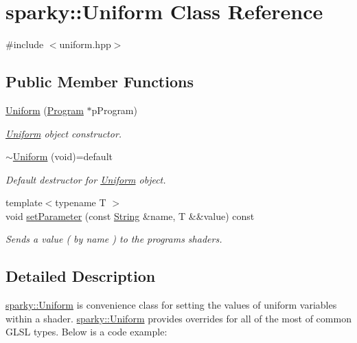 \hypertarget{classsparky_1_1_uniform}{}\section{sparky\+:\+:Uniform Class Reference}
\label{classsparky_1_1_uniform}


{\ttfamily \#include $<$uniform.\+hpp$>$}

\subsection*{Public Member Functions}
\begin{DoxyCompactItemize}
\item 
\hyperlink{classsparky_1_1_uniform_affc278498dc526c133c2133106cfbf83}{Uniform} (\hyperlink{classsparky_1_1_program}{Program} $\ast$p\+Program)
\begin{DoxyCompactList}\small\item\em \hyperlink{classsparky_1_1_uniform}{Uniform} object constructor. \end{DoxyCompactList}\item 
\hyperlink{classsparky_1_1_uniform_a612d7e16c60770dba6a93f4fa2f79983}{$\sim$\+Uniform} (void)=default\hypertarget{classsparky_1_1_uniform_a612d7e16c60770dba6a93f4fa2f79983}{}\label{classsparky_1_1_uniform_a612d7e16c60770dba6a93f4fa2f79983}

\begin{DoxyCompactList}\small\item\em Default destructor for \hyperlink{classsparky_1_1_uniform}{Uniform} object. \end{DoxyCompactList}\item 
{\footnotesize template$<$typename T $>$ }\\void \hyperlink{classsparky_1_1_uniform_a7a81c72ed894749245b0f2b52fccd203}{set\+Parameter} (const \hyperlink{classsparky_1_1_string}{String} \&name, T \&\&value) const 
\begin{DoxyCompactList}\small\item\em Sends a value ( by name ) to the programs shaders. \end{DoxyCompactList}\end{DoxyCompactItemize}


\subsection{Detailed Description}
\hyperlink{classsparky_1_1_uniform}{sparky\+::\+Uniform} is convenience class for setting the values of uniform variables within a shader. \hyperlink{classsparky_1_1_uniform}{sparky\+::\+Uniform} provides overrides for all of the most of common G\+L\+SL types. Below is a code example\+:

